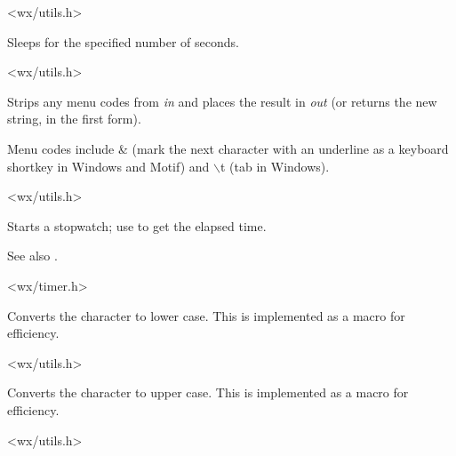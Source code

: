 
<wx/utils.h>

\label{wxsleep}


Sleeps for the specified number of seconds.


<wx/utils.h>




Strips any menu codes from {\it in} and places the result
in {\it out} (or returns the new string, in the first form).

Menu codes include \& (mark the next character with an underline
as a keyboard shortkey in Windows and Motif) and $\backslash$t (tab in Windows).


<wx/utils.h>

\label{wxstarttimer}


Starts a stopwatch; use  to get the elapsed time.

See also .


<wx/timer.h>

\label{wxtolower}


Converts the character to lower case. This is implemented as a macro for efficiency.


<wx/utils.h>

\label{wxtoupper}


Converts the character to upper case. This is implemented as a macro for efficiency.


<wx/utils.h>

\label{wxtrace}

